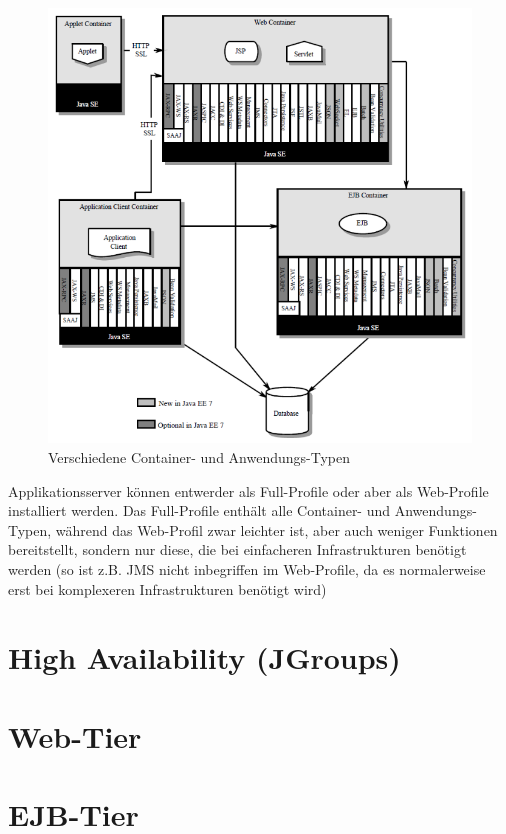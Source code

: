 \documentclass[a4paper, 11pt]{article}
\begin{document}
\begin{figure}[htb]
    \centering
    \includegraphics[keepaspectratio=true,height=20\baselineskip]{container_types.png}
    \caption{Verschiedene Container- und Anwendungs-Typen}
    \label{fig:container_types}
\end{figure}

Applikationsserver können entwerder als Full-Profile oder aber als Web-Profile installiert werden. Das Full-Profile enthält alle Container- und Anwendungs-Typen, während das Web-Profil zwar leichter ist, aber auch weniger Funktionen bereitstellt, sondern nur diese, die bei einfacheren Infrastrukturen benötigt werden (so ist z.B. JMS nicht inbegriffen im Web-Profile, da es normalerweise erst bei komplexeren Infrastrukturen benötigt wird)


\section{High Availability (JGroups)}

\section{Web-Tier}

\section{EJB-Tier}
\end{document}
